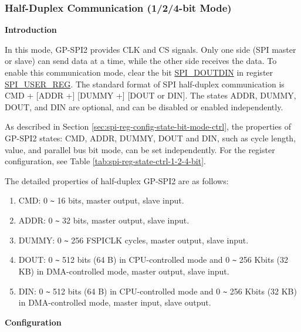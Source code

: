 \documentclass[main\_\_EN.tex]{subfiles}
\begin{document}
\subsubsection{Half-Duplex Communication (1/2/4-bit Mode)}
\label{sec:spi-half-duplex-1-2-4-bit}

\textbf{Introduction}

In this mode, GP-SPI2 provides CLK and CS signals. Only one side (SPI master or slave) can send data at a time, while the other side receives the data. To enable this communication mode, clear the bit \hyperref[fielddesc:SPIDOUTDIN]{SPI\_DOUTDIN} in register \hyperref[regdesc:SPIUSERREG]{SPI\_USER\_REG}. The standard format of SPI half-duplex communication is CMD + [ADDR +] [DUMMY +] [DOUT or DIN]. The states ADDR, DUMMY, DOUT, and DIN are optional, and can be disabled or enabled independently.

As described in Section \ref{sec:spi-reg-config-state-bit-mode-ctrl}, the properties of GP-SPI2 states: CMD, ADDR, DUMMY, DOUT and DIN, such as cycle length, value, and parallel bus bit mode, can be set independently. For the register configuration, see Table \ref{tab:spi-reg-state-ctrl-1-2-4-bit}.

The detailed properties of half-duplex GP-SPI2 are as follows:

\begin{enumerate}
    \item CMD: 0 \verb+~+ 16 bits, master output, slave input.
    \item ADDR: 0 \verb+~+ 32 bits, master output, slave input.
    \item DUMMY: 0 \verb+~+ 256 FSPICLK cycles, master output, slave input.
    \item DOUT: 0 \verb+~+ 512 bits (64 B) in CPU-controlled mode and 0 \verb+~+ 256 Kbits (32 KB) in DMA-controlled mode, master output, slave input.

    \item DIN: 0 \verb+~+ 512 bits (64 B) in CPU-controlled mode and 0 \verb+~+ 256 Kbits (32 KB) in DMA-controlled mode, master input, slave output.
\end{enumerate}

\textbf{Configuration}
\end{document}
